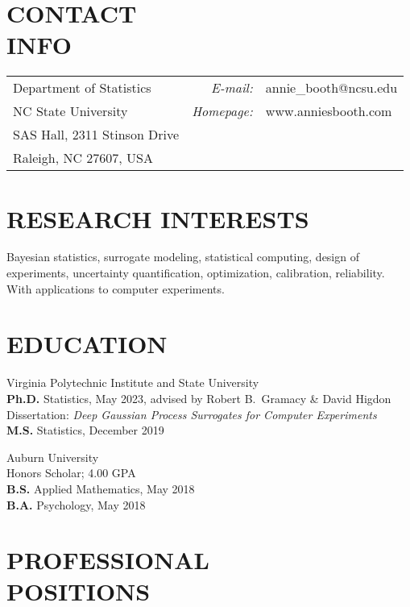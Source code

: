 \documentclass[margin,line,11pt]{res}
\begin{document}

\begin{resume}


\vspace{-0.1cm}
\section{\bf CONTACT\\INFO}
\vspace{.05in}
\begin{tabular}{@{}p{2.7in}rp{2in}}
Department of Statistics  & {\it E-mail:} & annie\_booth@ncsu.edu \\            
NC State University & {\it Homepage:} & www.anniesbooth.com \\   
SAS Hall, 2311 Stinson Drive \\     
Raleigh, NC 27607, USA  
\end{tabular}

\medskip
\section{\bf RESEARCH INTERESTS}

Bayesian statistics, surrogate modeling, statistical computing, design of experiments, 
uncertainty quantification, optimization, calibration, reliability.  
With applications to computer experiments.

\medskip
\section{\bf EDUCATION}

{\sc Virginia Polytechnic Institute and State University} \\
{\bf Ph.D.} Statistics, May 2023, advised by Robert B.~Gramacy \& David Higdon \\
Dissertation: {\it Deep Gaussian Process Surrogates for Computer Experiments} \\
{\bf M.S.} Statistics, December 2019 

{\sc Auburn University} \\
Honors Scholar; 4.00 GPA \\
{\bf B.S.} Applied Mathematics, May 2018 \\
{\bf B.A.} Psychology, May 2018

\medskip
\section{\bf PROFESSIONAL \\ POSITIONS}


\end{resume}
\end{document}
